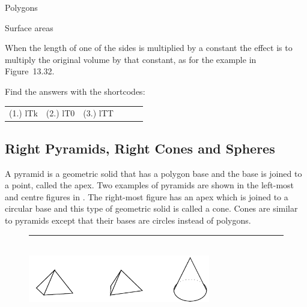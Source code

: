 \begin{exercises}{Polygons}
\begin{exercises}{Surface areas }
{\begin{mdframed}[linewidth=4, leftmargin=40, rightmargin=40]
\begin{exercise}
    \end{exercise}
    \end{mdframed}
    }
    \noindent
  
        \label{m39357*id64533}When the length of one of the sides is multiplied by a constant the effect is to multiply the original volume by that constant, as for the example in Figure~13.32.\par 
      
    

  \label{m39357*cid323}
\par {} Find the answers with the shortcodes:
 \par \begin{tabular}[h]{cccccc}
 (1.) lTk  &  (2.) lT0  &  (3.) lTT  & \end{tabular}



            \subsection{ Right Pyramids, Right Cones and Spheres}
            \nopagebreak
            
      
      \label{m39357*id62623}A pyramid is a geometric solid that has a polygon base and the base is joined to a point, called the apex. Two examples of pyramids are shown in the left-most and centre figures in . The right-most figure has an apex which is joined to a circular base and this type of geometric solid is called a cone. Cones are similar to pyramids except that their bases are circles instead of polygons.\par 
      
    \setcounter{subfigure}{0}


	\begin{figure}[H] %
    \begin{center}
    \rule[.1in]{\figurerulewidth}{.005in} \\
        \label{m39357*uid676!!!underscore!!!media}\label{m39357*uid676!!!underscore!!!printimage}\includegraphics[width=300px]{col11306.imgs/m39357_MG11C16_001.png} %
        

\end{center}
\end{figure}
\end{exercises}
\end{exercises}
